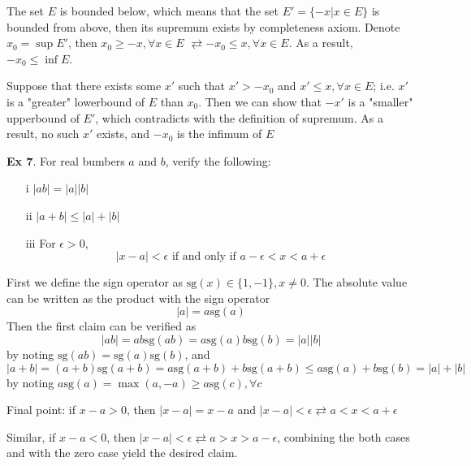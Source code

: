 The set $E$ is bounded below, which means that the set $E'=\{-x|x \in E\}$ is bounded from above, then its supremum exists by completeness axiom. Denote $x_0 = \sup E'$, then $x_0 \geq -x, \forall x \in E$ $\rightleftarrows -x_0 \leq x, \forall x \in E$. As a result, $-x_0 \leq \inf E$.

Suppose that there exists some $x'$ such that $x' > -x_0$ and $x' \leq x, \forall x \in E$; i.e. $x'$ is a "greater" lowerbound of $E$ than $x_0$. Then we can show that $-x'$ is a "smaller" upperbound of $E'$, which contradicts with the definition of supremum. As a result, no such $x'$ exists, and $-x_0$ is the infimum of $E$

\noindent \textbf{Ex 7}. For real bumbers $a$ and $b$, verify the following:
\begin{itemize}
    \item [i] $|ab| = |a||b|$
    \item [ii] $|a+b| \leq |a| + |b|$
    \item [iii]  For $\epsilon > 0$, 
    \begin{equation*}
        |x-a| < \epsilon \text{ if and only if } a-\epsilon < x < a + \epsilon
    \end{equation*}
\end{itemize}
First we define the sign operator as $\text{sg}(x)\in\{1, -1\}, x\neq 0$. The absolute value can be written as the product with the sign operator
\begin{equation*}
    |a| = a\text{sg}(a)
\end{equation*}
Then the first claim can be verified as
\begin{equation*}
    |ab| = ab \text{sg}(ab) = a \text{sg}(a) b \text{sg}(b) = |a||b|
\end{equation*}
by noting $\text{sg}(ab) =\text{sg}(a)\text{sg}(b)$,  and 
\begin{equation*}
    |a+b| = (a+b)\text{sg}(a+b) = a \text{sg}(a+b) + b \text{sg}(a+b) \leq a\text{sg}(a) + b \text{sg}(b) = |a| + |b|
\end{equation*}
by noting $a\text{sg}(a) = \max(a, -a) \geq a \text{sg}(c), \forall c$

Final point: if $x-a > 0$, then $|x-a| = x-a$ and $|x-a| < \epsilon \rightleftarrows a < x < a + \epsilon$

Similar, if $x-a < 0$, then $|x-a| < \epsilon \rightleftarrows a > x > a - \epsilon$, combining the both cases and with the zero case yield the desired claim.